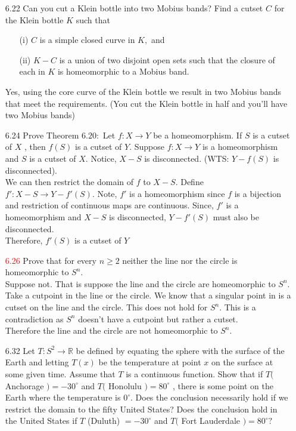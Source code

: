 \documentclass[12pt]{article}
\begin{document}
\begin{enumerate}
		\item[6.22] Can you cut a Klein bottle into two Mobius bands? Find a cutset $C$ for the
		Klein bottle $K$ such that
		 \begin{enumerate}
		 	\item[(i)]  $C$ is a simple closed curve in $K ,$ and
		 	\item[(ii)] $K - C$ is a union of two disjoint open sets such that the closure of
		 	each in $K$ is homeomorphic to a Mobius band.
		 \end{enumerate}
	 	Yes, using the core curve of the Klein bottle we result in two Mobius bands that meet the requirements. (You cut the Klein bottle in half and you'll have two Mobius bands)
		\item[6.24] Prove Theorem $6.20 :$ Let $f : X \rightarrow Y$ be a homeomorphism. If $S$ is a cutset of $X$ , then $f ( S )$ is a cutset of $Y .$
			Suppose $ f: X \rightarrow Y $ is a homeomorphism and $ S $ is a cutset of $X$. Notice, $ X-S $ is disconnected. (WTS: $ Y-f(S) $ is disconnected).\\
			 We can then restrict the domain of $ f $ to $ X-S $. Define $ f':X-S \rightarrow Y-f'(S) $. Note, $ f' $ is a homeomorphism since $ f $ is a bijection and restriction of continuous maps are continuous. Since, $ f' $ is a homeomorphism and $ X-S $ is disconnected, $ Y-f'(S) $ must also be disconnected.\\
			 Therefore, $ f'(S) $ is a cutset of $ Y $
		\item[\textcolor{red}{6.26}] Prove that for every $n \geq 2$ neither the line nor the circle is homeomorphic to	$S ^ { n } .$\\
		Suppose not. That is suppose the line and the circle are homeomorphic to $ S^n $. Take a cutpoint in the line or the circle. We know that a singular point in is a cutset on the line and the circle. This does not hold for $ S^n $. This is a contradiction as $ S^n $ doesn't have a cutpoint but rather a cutset. \\
		Therefore the line and the circle are not homeomorphic to $ S^n $.
		
		\item[6.32] Let $T : S ^ { 2 } \rightarrow \mathbb { R }$ be defined by equating the sphere with the surface of the Earth
		and letting $T ( x )$ be the temperature at point $x$ on the surface at some given time.
		Assume that $T$ is a continuous function. Show that if $T ($ Anchorage $) = - 30 ^ { \circ }$ and $T ($ Honolulu $) = 80 ^ { \circ }$ , there is some point on the Earth where the temperature	is $0 ^ { \circ } .$ Does the conclusion necessarily hold if we restrict the domain to the fifty United States? Does the conclusion hold in the United States if $T$ (Duluth) $=- 30 ^ { \circ }$ and $T ($ Fort Lauderdale $) = 80 ^ { \circ } ?$\\
		

\end{enumerate}
\end{document}
